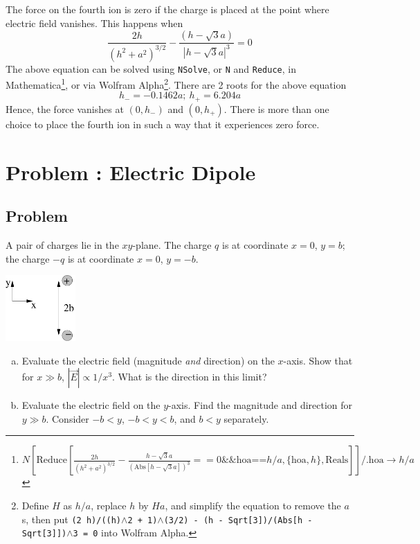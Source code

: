 \documentclass[solutions]{esg8022pset}
\begin{document}
  The force on the fourth ion is zero if the charge is placed at the point where electric field vanishes. This happens when
  \begin{equation*}
    \frac{2h}{(h^2 + a^2)^{3/2}} - \frac{(h - \sqrt3 a)}{|h - \sqrt3 a|^3} = 0
  \end{equation*}
  The above equation can be solved using \texttt{NSolve}, or \texttt{N} and \texttt{Reduce}, in Mathematica\footnote{$N\left[\text{Reduce}\left[\frac{2 h}{\left(h^2+a^2\right)^{3/2}}-\frac{h-\sqrt{3}a}{\left(\text{Abs}\left[h-\sqrt{3}a\right]\right)^3}==0\&\&\text{hoa}\text{==}h/ a,\{\text{hoa},h\},\text{Reals}\right]\right]\text{/.}\text{hoa}\to h/a$}, or via Wolfram Alpha\footnote{Define $H$ as $h / a$, replace $h$ by $H a$, and simplify the equation to remove the $a$s, then put \texttt{(2 h)/((h)$\wedge$2 + 1)$\wedge$(3/2) - (h - Sqrt[3])/(Abs[h - Sqrt[3]])$\wedge$3 = 0} into Wolfram Alpha.}. There are 2 roots for the above equation
  $$h_- = -0.1462a;\ h_+ = 6.204a$$
  Hence, the force vanishes at $(0, h_-)$ and $(0, h_+)$. There is more than one choice to place the fourth ion in such a way that it experiences zero force.
\section{Problem \thesection: Electric Dipole}
\subsection{Problem}
  A pair of charges lie in the $xy$-plane.  The charge $q$ is at coordinate $x = 0$, $y = b$; the charge $-q$ is at coordinate $x = 0$, $y = -b$.
  \begin{center}\includegraphics[width=0.2\textwidth]{ps01_8}\end{center}
  \begin{enumerate}[(a)]
    \item Evaluate the electric field (magnitude \emph{and} direction) on the $x$-axis.  Show that for $x \gg b$, $|\vec E| \propto 1 / x^3$.  What is the direction in this limit?
    \item Evaluate the electric field on the $y$-axis.  Find the magnitude and direction for $y \gg b$.  Consider $-b < y$, $-b < y < b$, and $b < y$ separately.
  \end{enumerate}
\end{document}
